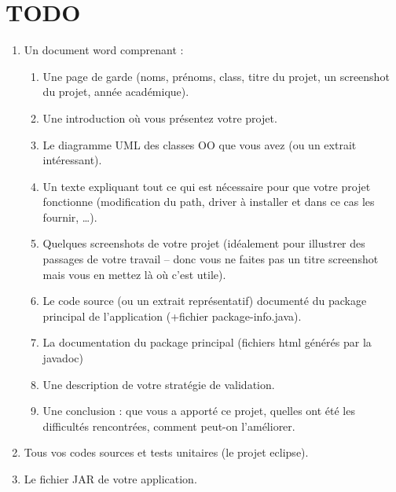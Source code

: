\documentclass[a4paper,titlepage]{article}
\author{Baptiste Vergote & Martin Schreinemachers}
\begin{document}
\clearpage
\noindent
\tableofcontents
\clearpage
\section{TODO}
\begin{enumerate}
	\item Un document word comprenant : 
	\begin{enumerate}
		\item Une page de garde (noms, prénoms, class, titre du projet, un screenshot du projet, année académique).
		\item Une introduction où vous présentez votre projet.
		\item Le diagramme UML des classes OO que vous avez (ou un extrait intéressant).
		\item Un texte expliquant tout ce qui est nécessaire pour que votre projet fonctionne (modification du path, driver à installer et dans ce cas les fournir, …).
		\item Quelques screenshots de votre projet (idéalement pour illustrer des passages de votre travail – donc vous ne faites pas un titre screenshot mais vous en mettez là où c’est utile).
		\item Le code source (ou un extrait représentatif) documenté du package principal de l’application (+fichier package-info.java).
		\item La documentation du package principal (fichiers html générés par la javadoc)
		\item Une description de votre stratégie de validation.
		\item Une conclusion : que vous a apporté ce projet, quelles ont été les difficultés rencontrées, comment peut-on l’améliorer.
	\end{enumerate}
	\item Tous vos codes sources et tests unitaires (le projet eclipse).
	\item Le fichier JAR de votre application.
\end{enumerate}
\clearpage
\end{document}
